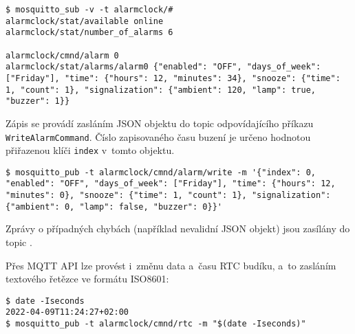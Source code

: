 \begin{lstlisting}[style=terminal]
$ mosquitto_sub -v -t alarmclock/#
alarmclock/stat/available online
alarmclock/stat/number_of_alarms 6

alarmclock/cmnd/alarm 0
alarmclock/stat/alarms/alarm0 {"enabled": "OFF", "days_of_week": ["Friday"], "time": {"hours": 12, "minutes": 34}, "snooze": {"time": 1, "count": 1}, "signalization": {"ambient": 120, "lamp": true, "buzzer": 1}}
\end{lstlisting}

Zápis se provádí zasláním JSON objektu do topic odpovídajícího příkazu
\texttt{WriteAlarmCommand}. Číslo zapisovaného času buzení je určeno hodnotou
přiřazenou klíči \texttt{index} v~tomto objektu.
\begin{lstlisting}[style=terminal]
$ mosquitto_pub -t alarmclock/cmnd/alarm/write -m '{"index": 0, "enabled": "OFF", "days_of_week": ["Friday"], "time": {"hours": 12, "minutes": 0}, "snooze": {"time": 1, "count": 1}, "signalization": {"ambient": 0, "lamp": false, "buzzer": 0}}'
\end{lstlisting}
Zprávy o případných chybách (například nevalidní JSON objekt) jsou zasílány do
topic .

Přes MQTT API lze provést i~změnu data a~času \acs{RTC} budíku, a~to zasláním
textového řetězce ve formátu ISO8601:
\begin{lstlisting}[style=terminal]
$ date -Iseconds
2022-04-09T11:24:27+02:00
$ mosquitto_pub -t alarmclock/cmnd/rtc -m "$(date -Iseconds)"
\end{lstlisting}




